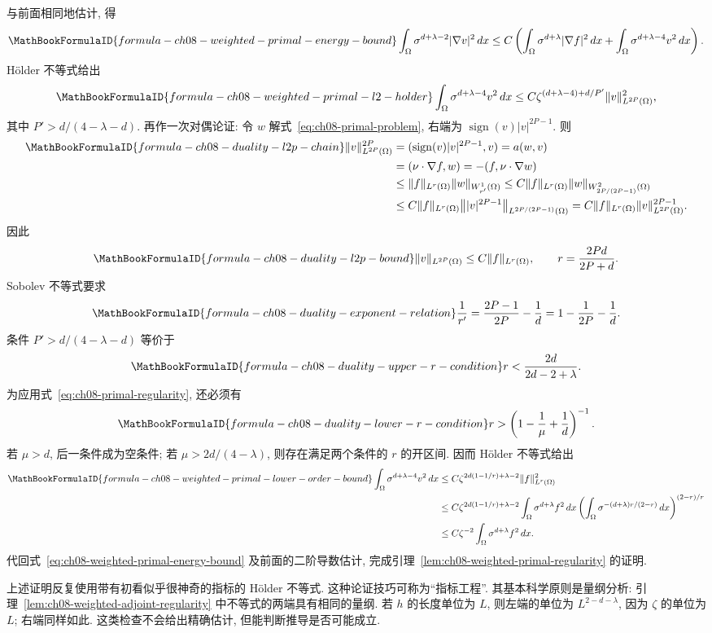 与前面相同地估计, 得
\begin{equation}
\MathBookFormulaID{formula-ch08-weighted-primal-energy-bound}
\label{eq:ch08-weighted-primal-energy-bound}
\int_\Omega\sigma^{d+\lambda-2}|\nabla v|^2\,dx
\leq C\left(\int_\Omega\sigma^{d+\lambda}|\nabla f|^2\,dx
+\int_\Omega\sigma^{d+\lambda-4}v^2\,dx\right).
\end{equation}
Hölder 不等式给出
\[
\MathBookFormulaID{formula-ch08-weighted-primal-l2-holder}
\int_\Omega\sigma^{d+\lambda-4}v^2\,dx
\leq C\zeta^{(d+\lambda-4)+d/P'}\|v\|_{L^{2P}(\Omega)}^2,
\]
其中 $P'>d/(4-\lambda-d)$. 再作一次对偶论证: 令 $w$ 解式~\eqref{eq:ch08-primal-problem}, 右端为 $\operatorname{sign}(v)|v|^{2P-1}$. 则
\begin{align*}
\MathBookFormulaID{formula-ch08-duality-l2p-chain}
\|v\|_{L^{2P}(\Omega)}^{2P}
&=(\operatorname{sign}(v)|v|^{2P-1},v)=a(w,v)\\
&=(\nu\cdot\nabla f,w)=-(f,\nu\cdot\nabla w)\\
&\leq\|f\|_{L^r(\Omega)}\|w\|_{W_{r'}^1(\Omega)}
\leq C\|f\|_{L^r(\Omega)}\|w\|_{W_{2P/(2P-1)}^2(\Omega)}\\
&\leq C\|f\|_{L^r(\Omega)}
\bigl\||v|^{2P-1}\bigr\|_{L^{2P/(2P-1)}(\Omega)}
=C\|f\|_{L^r(\Omega)}\|v\|_{L^{2P}(\Omega)}^{2P-1}.
\end{align*}
因此
\[
\MathBookFormulaID{formula-ch08-duality-l2p-bound}
\|v\|_{L^{2P}(\Omega)}\leq C\|f\|_{L^r(\Omega)},
\qquad r=\frac{2Pd}{2P+d}.
\]
Sobolev 不等式要求
\[
\MathBookFormulaID{formula-ch08-duality-exponent-relation}
\frac1{r'}=\frac{2P-1}{2P}-\frac1d
=1-\frac1{2P}-\frac1d.
\]
条件 $P'>d/(4-\lambda-d)$ 等价于
\[
\MathBookFormulaID{formula-ch08-duality-upper-r-condition}
r<\frac{2d}{2d-2+\lambda}.
\]
为应用式~\eqref{eq:ch08-primal-regularity}, 还必须有
\[
\MathBookFormulaID{formula-ch08-duality-lower-r-condition}
r>\left(1-\frac1\mu+\frac1d\right)^{-1}.
\]
若 $\mu>d$, 后一条件成为空条件; 若 $\mu>2d/(4-\lambda)$, 则存在满足两个条件的 $r$ 的开区间. 因而 Hölder 不等式给出
\begin{align*}
\MathBookFormulaID{formula-ch08-weighted-primal-lower-order-bound}
\int_\Omega\sigma^{d+\lambda-4}v^2\,dx
&\leq C\zeta^{2d(1-1/r)+\lambda-2}\|f\|_{L^r(\Omega)}^2\\
&\leq C\zeta^{2d(1-1/r)+\lambda-2}
\int_\Omega\sigma^{d+\lambda}f^2\,dx
\left(\int_\Omega\sigma^{-(d+\lambda)r/(2-r)}\,dx\right)^{(2-r)/r}\\
&\leq C\zeta^{-2}\int_\Omega\sigma^{d+\lambda}f^2\,dx.
\end{align*}
代回式~\eqref{eq:ch08-weighted-primal-energy-bound} 及前面的二阶导数估计, 完成引理~\ref{lem:ch08-weighted-primal-regularity} 的证明.

\begin{Remark}
\label{rem:ch08-index-engineering}
上述证明反复使用带有初看似乎很神奇的指标的 Hölder 不等式. 这种论证技巧可称为“指标工程”. 其基本科学原则是量纲分析: 引理~\ref{lem:ch08-weighted-adjoint-regularity} 中不等式的两端具有相同的量纲. 若 $h$ 的长度单位为 $L$, 则左端的单位为 $L^{2-d-\lambda}$, 因为 $\zeta$ 的单位为 $L$; 右端同样如此. 这类检查不会给出精确估计, 但能判断推导是否可能成立.
\end{Remark}
